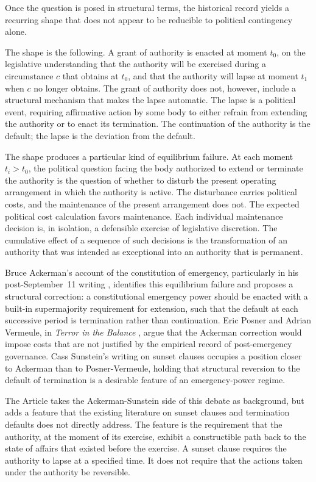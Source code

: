 Once the question is posed in structural terms,
the historical record yields a recurring shape that does not appear to be reducible to political contingency alone.

The shape is the following.
A grant of authority is enacted at moment $t_0$,
on the legislative understanding that the authority will be exercised during a circumstance $c$ that obtains at $t_0$,
and that the authority will lapse at moment $t_1$ when $c$ no longer obtains.
The grant of authority does not, however, include a structural mechanism that makes the lapse automatic.
The lapse is a political event, requiring affirmative action by some body
to either refrain from extending the authority or to enact its termination.
The continuation of the authority is the default;
the lapse is the deviation from the default.

The shape produces a particular kind of equilibrium failure.
At each moment $t_i > t_0$, the political question facing the body authorized to extend or terminate
the authority is the question of whether to disturb the present operating arrangement
in which the authority is active.
The disturbance carries political costs, and the maintenance of the present arrangement does not.
The expected political cost calculation favors maintenance.
Each individual maintenance decision is, in isolation, a defensible exercise of legislative discretion.
The cumulative effect of a sequence of such decisions is the transformation of an authority that was
intended as exceptional into an authority that is permanent.

Bruce Ackerman's account of the constitution of emergency, particularly in his post-September~11 writing
\cite{TODO_ackerman_before_next_attack},
identifies this equilibrium failure and proposes a structural correction:
a constitutional emergency power should be enacted with a built-in supermajority requirement for extension,
such that the default at each successive period is termination rather than continuation.
Eric Posner and Adrian Vermeule, in \emph{Terror in the Balance} \cite{TODO_posner_vermeule_terror},
argue that the Ackerman correction would impose costs that are not justified by the empirical record
of post-emergency governance.
Cass Sunstein's writing on sunset clauses \cite{TODO_sunstein_sunset_clauses} occupies a position closer
to Ackerman than to Posner-Vermeule, holding that structural reversion to the default of termination
is a desirable feature of an emergency-power regime.

The Article takes the Ackerman-Sunstein side of this debate as background,
but adds a feature that the existing literature on sunset clauses and termination defaults does not directly address.
The feature is the requirement that the authority, at the moment of its exercise,
exhibit a constructible path back to the state of affairs that existed before the exercise.
A sunset clause requires the authority to lapse at a specified time.
It does not require that the actions taken under the authority be reversible.

